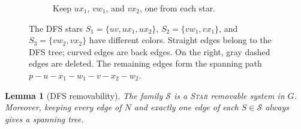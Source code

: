 \documentclass[11pt]{amsart}
\newcommand{\1}{\mathbbm{1}}
\newtheorem{lemma}[theorem]{Lemma}
\begin{document}
\begin{figure}[H]
\begin{subfigure}[t]{.32\textwidth}
{}
\caption{Keep $ux_1$, $vw_1$, and $vx_2$, one from each star.}
\end{subfigure}

\caption{The DFS stars
$S_1=\{uv,ux_1,ux_2\}$,
$S_2=\{vw_1,vx_1\}$, and
$S_3=\{vw_2,vx_2\}$ have different colors.
Straight edges belong to the DFS tree; curved edges are back edges.
On the right, gray dashed edges are deleted. The remaining edges
form the spanning path $p-u-x_1-w_1-v-x_2-w_2$.}
\label{fig:DFS-star}
\endgroup
\end{figure}
\begin{lemma}[DFS removability]
\label{lem:DFS-removability}
\label{lem:MS-full-star-removability}
The family $\mathcal{S}$ is a \textsc{Star} removable system in $G$.
Moreover, keeping every edge of $N$ and exactly one edge of each
$S\in\mathcal{S}$ always gives a spanning tree.
\end{lemma}
\end{document}

